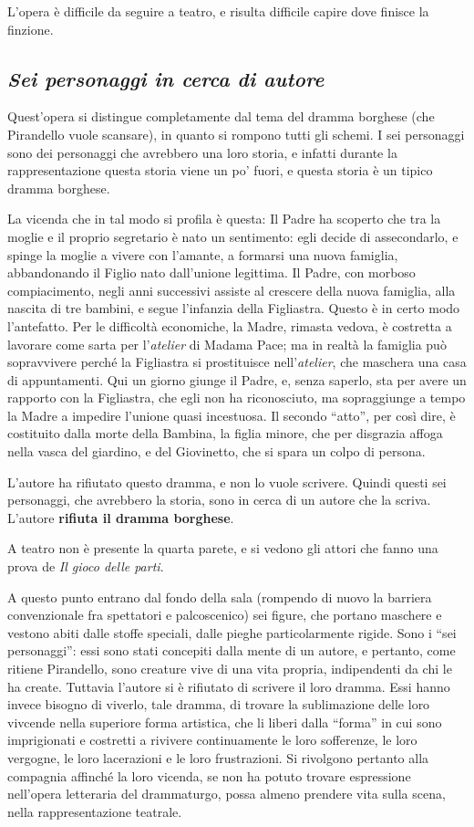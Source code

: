 \documentclass[a4paper, twoside, titlepage]{book}
\newcounter{mar}
\newcommand{\straniero}[1]{\textit{#1}} %
\begin{document}
L’opera è difficile da seguire a teatro, e risulta difficile capire dove finisce la finzione.

\subsection{\textit{Sei personaggi in cerca di autore}}

Quest’opera si distingue completamente dal tema del dramma borghese (che Pirandello vuole scansare), in quanto si rompono tutti gli schemi.
I sei personaggi sono dei personaggi che avrebbero una loro storia, e infatti durante la rappresentazione questa storia viene un po’ fuori, e questa storia è un tipico dramma borghese.

La vicenda che in tal modo si profila è questa: Il Padre ha scoperto che tra la moglie e il proprio segretario è nato un sentimento: egli decide di assecondarlo, e spinge la moglie a vivere con l'amante, a formarsi una nuova famiglia, abbandonando il Figlio nato dall'unione legittima. Il Padre, con morboso compiacimento, negli anni successivi assiste al crescere della nuova famiglia, alla nascita di tre bambini, e segue l'infanzia della Figliastra. Questo è in certo modo l'antefatto. Per le difficoltà economiche, la Madre, rimasta vedova, è costretta a lavorare come sarta per l'\straniero{atelier} di Madama Pace; ma in realtà la famiglia può sopravvivere perché la Figliastra si prostituisce nell'\straniero{atelier}, che maschera una casa di appuntamenti. Qui un giorno giunge il Padre, e, senza saperlo, sta per avere un rapporto con la Figliastra, che egli non ha riconosciuto, ma sopraggiunge a tempo la Madre a impedire l'unione quasi incestuosa. Il secondo ``atto'', per così dire, è costituito dalla morte della Bambina, la figlia minore, che per disgrazia affoga nella vasca del giardino, e del Giovinetto, che si spara un colpo di persona.

L’autore ha rifiutato questo dramma, e non lo vuole scrivere. Quindi questi sei personaggi, che avrebbero la storia, sono in cerca di un autore che la scriva. L’autore \textbf{rifiuta il dramma borghese}.

A teatro non è presente la quarta parete, e si vedono gli attori che fanno una prova de \textit{Il gioco delle parti}.

A questo punto entrano dal fondo della sala (rompendo di nuovo la barriera convenzionale fra spettatori e palcoscenico) sei figure, che portano maschere e vestono abiti dalle stoffe speciali, dalle pieghe particolarmente rigide. Sono i ``sei personaggi'': essi sono stati concepiti dalla mente di un autore, e pertanto, come ritiene Pirandello, sono creature vive di una vita propria, indipendenti da chi le ha create. Tuttavia l'autore si è rifiutato di scrivere il loro dramma. Essi hanno invece bisogno di viverlo, tale dramma, di trovare la sublimazione delle loro vivcende nella superiore forma artistica, che li liberi dalla ``forma'' in cui sono imprigionati e costretti a rivivere continuamente le loro sofferenze, le loro vergogne, le loro lacerazioni e le loro frustrazioni. Si rivolgono pertanto alla compagnia affinché la loro vicenda, se non ha potuto trovare espressione nell'opera letteraria del drammaturgo, possa almeno prendere vita sulla scena, nella rappresentazione teatrale.
\end{document}
